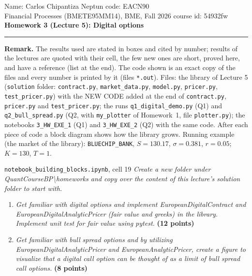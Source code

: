 \documentclass[11pt,a4paper]{article}
\newcommand{\subhead}[1]{\par\medskip\noindent{\large\bfseries #1}\par\smallskip\noindent\ignorespaces}
\renewcommand{\subhead}[1]{\par\medskip\needspace{8\baselineskip}\noindent{\large\bfseries #1}\par\smallskip\noindent\ignorespaces}
\begin{document}
\noindent Name: Carlos Chipantiza \hfill Neptun code: EACN90\\
\noindent Financial Processes (BMETE95MM14), BME, Fall 2026 \hfill course id: 54932fw\\[2pt]
{\large\textbf{Homework 3 (Lecture 5): Digital options}}\\[2pt]
\noindent\rule{\textwidth}{0.4pt}

\noindent\textbf{Remark.} The results used are stated in boxes and cited by number; results of the lectures are quoted with their cell, the few new ones are short, proved here, and have a reference (list at the end). The code shown is an exact copy of the files and every number is printed by it (files \texttt{*.out}). Files: the library of Lecture 5 (\texttt{solution} folder: \texttt{contract.py}, \texttt{market\_data.py}, \texttt{model.py}, \texttt{pricer.py}, \texttt{test\_pricer.py}) with the NEW CODE added at the end of \texttt{contract.py}, \texttt{pricer.py} and \texttt{test\_pricer.py}; the runs \texttt{q1\_digital\_demo.py} (Q1) and \texttt{q2\_bull\_spread.py} (Q2, with \texttt{my\_plotter} of Homework~1, file \texttt{plotter.py}); the notebooks \texttt{3\_HW\_EXE\_1} (Q1) and \texttt{3\_HW\_EXE\_2} (Q2) with the same code. After each piece of code a block diagram shows how the library grows. Running example (the market of the library): \texttt{BLUECHIP\_BANK}, $S=130.17$, $\sigma=0.381$, $r=0.05$; $K=130$, $T=1$.

\subhead{1. The assignment.}
\begin{stmbox}{\texttt{notebook\_building\_blocks.ipynb}, cell 19}
\emph{Create a new folder under QuantCourseBP\textbackslash homeworks and copy over the content of this lecture's solution folder to start with.}
\begin{enumerate}
\item \emph{Get familiar with digital options and implement EuropeanDigitalContract and EuropeanDigitalAnalyticPricer (fair value and greeks) in the library. Implement unit test for fair value using pytest.} \textbf{(12 points)}
\item \emph{Get familiar with bull spread options and by utilizing EuropeanDigitalAnalyticPricer and EuropeanAnalyticPricer, create a figure to visualize that a digital call option can be thought of as a limit of bull spread call options.} \textbf{(8 points)}
\end{enumerate}
\end{stmbox}
\end{document}
